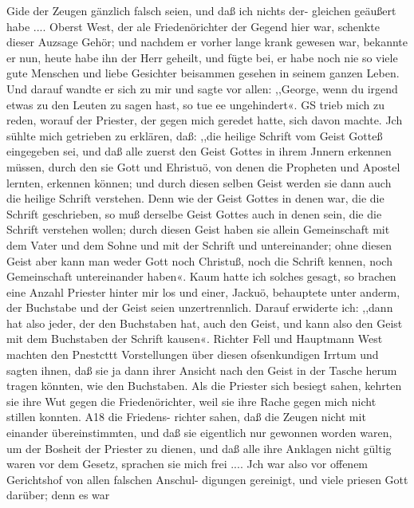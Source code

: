 Gide der Zeugen gänzlich falsch seien, und daß ich nichts der-
gleichen geäußert habe .... Oberst West, der ale Friedenörichter
der Gegend hier war, schenkte dieser Auzsage Gehör; und
nachdem er vorher lange krank gewesen war, bekannte er nun,
heute habe ihn der Herr geheilt, und fügte bei, er habe noch nie
so viele gute Menschen und liebe Gesichter beisammen gesehen in
seinem ganzen Leben. Und darauf wandte er sich zu mir und
sagte vor allen: ,,George, wenn du irgend etwas zu den Leuten
zu sagen hast, so tue ee ungehindert«. GS trieb mich zu reden,
worauf der Priester, der gegen mich geredet hatte, sich davon
machte. Jch sühlte mich getrieben zu erklären, daß: ,,die heilige
Schrift vom Geist Gotteß eingegeben sei, und daß alle zuerst
den Geist Gottes in ihrem Jnnern erkennen müssen, durch den
sie Gott und Ehristuö, von denen die Propheten und Apostel
lernten, erkennen können; und durch diesen selben Geist werden
sie dann auch die heilige Schrift verstehen. Denn wie der Geist
Gottes in denen war, die die Schrift geschrieben, so muß derselbe
Geist Gottes auch in denen sein, die die Schrift verstehen wollen;
durch diesen Geist haben sie allein Gemeinschaft mit dem Vater
und dem Sohne und mit der Schrift und untereinander; ohne
diesen Geist aber kann man weder Gott noch Christuß, noch die
Schrift kennen, noch Gemeinschaft untereinander haben«. Kaum
hatte ich solches gesagt, so brachen eine Anzahl Priester hinter
mir los und einer, Jackuö, behauptete unter anderm, der
Buchstabe und der Geist seien unzertrennlich. Darauf erwiderte
ich: ,,dann hat also jeder, der den Buchstaben hat, auch den
Geist, und kann also den Geist mit dem Buchstaben der Schrift
kausen«. Richter Fell und Hauptmann West machten den Pnestcttt
Vorstellungen über diesen ofsenkundigen Irrtum und sagten ihnen,
daß sie ja dann ihrer Ansicht nach den Geist in der Tasche herum
tragen könnten, wie den Buchstaben. Als die Priester sich besiegt
sahen, kehrten sie ihre Wut gegen die Friedenörichter, weil sie
ihre Rache gegen mich nicht stillen konnten. A18 die Friedens-
richter sahen, daß die Zeugen nicht mit einander übereinstimmten,
und daß sie eigentlich nur gewonnen worden waren, um der
Bosheit der Priester zu dienen, und daß alle ihre Anklagen nicht
gültig waren vor dem Gesetz, sprachen sie mich frei .... Jch
war also vor offenem Gerichtshof von allen falschen Anschul-
digungen gereinigt, und viele priesen Gott darüber; denn es war


